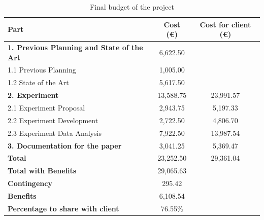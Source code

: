 \begin{table} [H]
    \centering
    \begin{tabular}{|p{6.5cm}|c|c|}
        \hline
        \textbf{Part} & \textbf{Cost (\euro)} & \textbf{Cost for client (\euro)}\\ \hline
        \textbf{1. Previous Planning and State of the Art} & 6,622.50 & \\ \hline
            1.1 Previous Planning & 1,005.00 & \\ \hline
            1.2 State of the Art & 5,617.50 & \\ \hline
        \textbf{2. Experiment} & 13,588.75 & 23,991.57 \\ \hline
            2.1 Experiment Proposal & 2,943.75 & 5,197.33 \\ \hline
            2.2 Experiment Development & 2,722.50 & 4,806.70 \\ \hline 
            2.3 Experiment Data Analysis & 7,922.50 & 13,987.54 \\ \hline
        \textbf{3. Documentation for the paper} & 3,041.25 & 5,369.47 \\ \hline
        \textbf{Total} & 23,252.50 & 29,361.04 \\ \hline
        \textbf{Total with Benefits} & 29,065.63 & \\ \hline
        \textbf{Contingency} & 295.42 & \\ \hline
        \textbf{Benefits} & 6,108.54 &  \\ \hline
        \textbf{Percentage to share with client} & 76.55\% &  \\ \hline
    \end{tabular}
    \caption{Final budget of the project}
    \label{tab:margin}
\end{table}